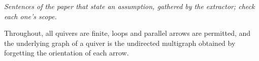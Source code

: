 \begin{theorem}\label{Arden24A-setup}
\emph{Sentences of the paper that state an assumption, gathered by the extractor; check each one's scope.}

Throughout, all quivers are finite, loops and parallel arrows are permitted, and the underlying graph of a quiver is the undirected multigraph obtained by forgetting the orientation of each arrow.
\end{theorem}